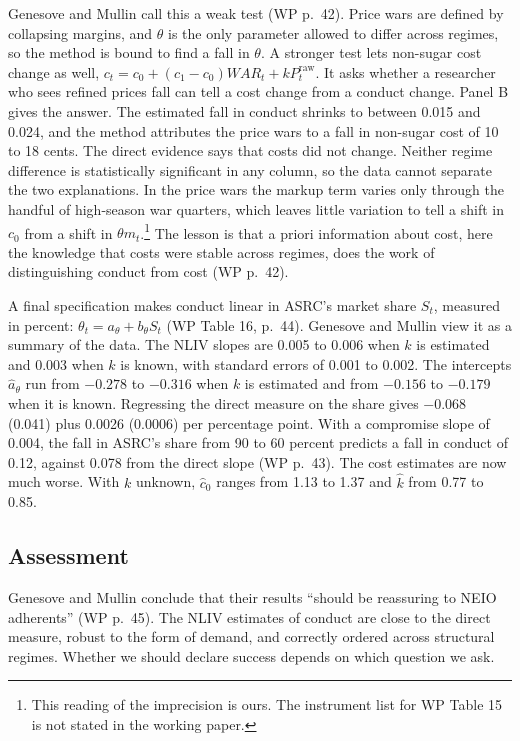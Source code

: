 Genesove and Mullin call this a weak test (WP p.~42). Price wars are defined by collapsing margins, and
$\theta$ is the only parameter allowed to differ across regimes, so the method is bound to find a fall in
$\theta$. A stronger test lets non-sugar cost change as well, $c_t = c_0 + (c_1 - c_0)\mathit{WAR}_t +
kP^{\mathrm{raw}}_t$. It asks whether a researcher who sees refined prices fall can tell a cost change from a
conduct change. Panel B gives the answer. The estimated fall in conduct shrinks to between 0.015 and 0.024,
and the method attributes the price wars to a fall in non-sugar cost of 10 to 18 cents. The direct evidence
says that costs did not change. Neither regime difference is statistically significant in any column, so
the data cannot separate the two explanations. In the price wars the markup term varies only through the
handful of high-season war quarters, which leaves little variation to tell a shift in $c_0$ from a shift in
$\theta m_t$.\footnote{This reading of the imprecision is ours. The instrument list for WP Table 15 is not
stated in the working paper.} The lesson is that a priori information about cost, here the knowledge that
costs were stable across regimes, does the work of distinguishing conduct from cost (WP p.~42).

A final specification makes conduct linear in ASRC's market share $S_t$, measured in percent:
$\theta_t = a_\theta + b_\theta S_t$ (WP Table 16, p.~44). Genesove and Mullin view it as a summary of the data. The NLIV slopes are 0.005 to 0.006 when $k$ is estimated and 0.003 when $k$ is known,
with standard errors of 0.001 to 0.002. The intercepts $\hat a_\theta$ run from $-0.278$ to $-0.316$ when $k$ is
estimated and from $-0.156$ to $-0.179$ when it is known. Regressing the direct measure on the share gives $-0.068$ (0.041) plus
0.0026 (0.0006) per percentage point. With a compromise slope of 0.004, the fall in ASRC's share from 90 to 60
percent predicts a fall in conduct of 0.12, against 0.078 from the direct slope (WP p.~43). The cost
estimates are now much worse. With $k$ unknown, $\hat c_0$ ranges from 1.13 to 1.37 and $\hat k$ from 0.77 to
0.85.

\subsection{Assessment}\label{sec:03-sugar-assessment}

Genesove and Mullin conclude that their results ``should be reassuring to NEIO adherents'' (WP p.~45). The
NLIV estimates of conduct are close to the direct measure, robust to the form of demand, and correctly
ordered across structural regimes. Whether we should declare success depends on which question we ask.

